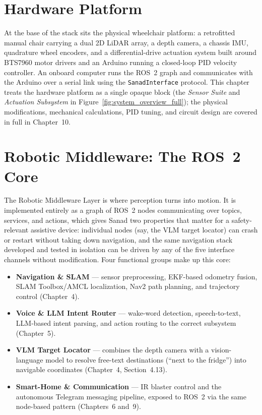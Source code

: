 \section{Hardware Platform}
\label{sec:arch_hardware}

At the base of the stack sits the physical wheelchair platform: a retrofitted manual chair carrying a dual 2D LiDAR array, a depth camera, a chassis IMU, quadrature wheel encoders, and a differential-drive actuation system built around BTS7960 motor drivers and an Arduino running a closed-loop PID velocity controller. An onboard computer runs the ROS~2 graph and communicates with the Arduino over a serial link using the \texttt{SanadInterface} protocol. This chapter treats the hardware platform as a single opaque block (the \textit{Sensor Suite} and \textit{Actuation Subsystem} in Figure~\ref{fig:system_overview_full}); the physical modifications, mechanical calculations, PID tuning, and circuit design are covered in full in Chapter~10.

\section{Robotic Middleware: The ROS~2 Core}
\label{sec:arch_ros2core}

The Robotic Middleware Layer is where perception turns into motion. It is implemented entirely as a graph of ROS~2 nodes communicating over topics, services, and actions, which gives Sanad two properties that matter for a safety-relevant assistive device: individual nodes (say, the VLM target locator) can crash or restart without taking down navigation, and the same navigation stack developed and tested in isolation can be driven by any of the five interface channels without modification. Four functional groups make up this core:

\begin{itemize}
    \item \textbf{Navigation \& SLAM} --- sensor preprocessing, EKF-based odometry fusion, SLAM Toolbox/AMCL localization, Nav2 path planning, and trajectory control (Chapter~4).
    \item \textbf{Voice \& LLM Intent Router} --- wake-word detection, speech-to-text, LLM-based intent parsing, and action routing to the correct subsystem (Chapter~5).
    \item \textbf{VLM Target Locator} --- combines the depth camera with a vision-language model to resolve free-text destinations (``next to the fridge'') into navigable coordinates (Chapter~4, Section~4.13).
    \item \textbf{Smart-Home \& Communication} --- IR blaster control and the autonomous Telegram messaging pipeline, exposed to ROS~2 via the same node-based pattern (Chapters~6 and~9).
\end{itemize}

